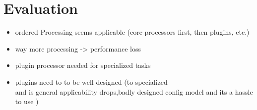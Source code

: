 \chapter{Evaluation}


\begin{itemize}
  \item ordered Processing seems applicable (core processors first, then plugins, etc.)
  \item way more processing -> performance loss
  \item plugin processor needed for specialized tasks
  \item plugins need to to be well designed (to specialized\\
        and is general applicability drops,badly designed config model and its a hassle to use )
\end{itemize}

